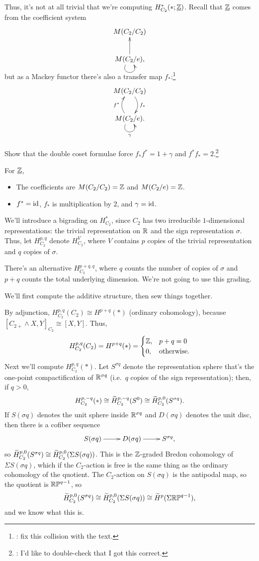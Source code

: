 Thus, it's not at all trivial that we're computing $H_{C_2}^*(*;\underline{\mathbb Z})$. Recall that $\underline{\mathbb Z}$ comes
from the coefficient system
\[\xymatrix{
	M(C_2/C_2)\\
	M(C_2/e),\ar[u]\ar@(dl,dr)
}\]
but as a Mackey functor there's also a transfer map $f_*$:\footnote{\TODO: fix this \Xy{} collision with the text.}
\[\xymatrix{
	M(C_2/C_2)\ar@/^0.4cm/[d]^{f_*}\\
	M(C_2/e).\ar@/^0.4cm/[u]^{f^*}\ar@(dl,dr)_\gamma
}\]
\begin{ex}
Show that the double coset formulae force $f_*f^* = 1+\gamma$ and $f^*f_* = 2$.\footnote{\TODO: I'd like to
double-check that I got this correct.}
\end{ex}
For $\underline{\mathbb Z}$,
\begin{itemize}
	\item The coefficients are $M(C_2/C_2) = \mathbb Z$ and $M(C_2/e) = \mathbb Z$.
	\item $f^* = \mathrm{id}$, $f_*$ is multiplication by $2$, and $\gamma = \mathrm{id}$.
\end{itemize}
We'll introduce a bigrading on $H^*_{C_2}$, since $C_2$ has two irreducible $1$-dimensional representations: the
trivial representation on $\mathbb R$ and the sign representation $\sigma$. Thus, let $H_{C_2}^{p,q}$ denote $H_{C_2}^V$,
where $V$ contains $p$ copies of the trivial representation and $q$ copies of $\sigma$.
\begin{rem}
There's an alternative  $H_{C_2}^{p+q,q}$, where $q$ counts the number of copies of $\sigma$
and $p+q$ counts the total underlying dimension. We're not going to use this grading.
\end{rem}
We'll first compute the additive structure, then sew things together.

By adjunction, $H_{C_2}^{p,q}(C_2)\cong H^{p+q}(*)$ (ordinary cohomology), because $[C_{2+}\wedge X, Y]_{C_2}\cong
[X,Y]$. Thus,
\[H_{C_2}^{p,q}(C_2) = H^{p+q}(*) = \begin{cases}
	\mathbb Z, &p+q=0\\
	0, &\text{otherwise.}
\end{cases}\]
Next we'll compute $H_{C_2}^{p,q}(*)$. Let $S^{\sigma q}$ denote the representation sphere that's the one-point
compactification of $\mathbb R^{\sigma q}$ (i.e.\ $q$ copies of the sign representation); then, if $q > 0$,
\[H_{C_2}^{p,-q}(*)\cong \widetilde H_{C_2}^{p,-q}(S^0)\cong \widetilde H_{C_2}^{p,0}(S^{\sigma q}).\]
If $S(\sigma q)$ denotes the unit sphere inside $\mathbb R^{\sigma q}$ and $D(\sigma q)$ denotes the unit disc, then there
is a cofiber sequence
\begin{equation}
\label{signed_cofiber}
\xymatrix{
	S(\sigma q)\ar[r] & D(\sigma q)\ar[r] & S^{\sigma q},
}
\end{equation}
so $\widetilde H_{C_2}^{p,0}(S^{\sigma q})\cong\widetilde H_{C_2}^{p,0}(\Sigma S(\sigma q))$. This is the $\mathbb Z$-graded Bredon
cohomology of $\Sigma S(\sigma q)$, which if the $C_2$-action is free is the same thing as the ordinary cohomology
of the quotient. The $C_2$-action on $S(\sigma q)$ is the antipodal map, so the quotient is $\mathbb{RP}^{q-1}$, so
\[\widetilde H_{C_2}^{p,0}(S^{\sigma q})\cong \widetilde H_{C_2}^{p,0}(\Sigma S(\sigma q))\cong \widetilde H^p(\Sigma\mathbb{RP}^{q-1}),\]
and we know what this is.

